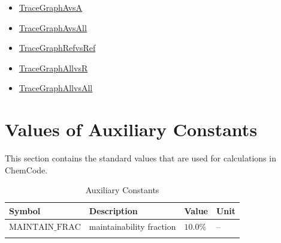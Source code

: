 \documentclass[12pt]{article}
\begin{document}
\begin{itemize}
\item{\hyperref{../../../../traceygraphs/chemcode/avsa.svg}{}{}{TraceGraphAvsA}}
\item{\hyperref{../../../../traceygraphs/chemcode/avsall.svg}{}{}{TraceGraphAvsAll}}
\item{\hyperref{../../../../traceygraphs/chemcode/refvsref.svg}{}{}{TraceGraphRefvsRef}}
\item{\hyperref{../../../../traceygraphs/chemcode/allvsr.svg}{}{}{TraceGraphAllvsR}}
\item{\hyperref{../../../../traceygraphs/chemcode/allvsall.svg}{}{}{TraceGraphAllvsAll}}
\end{itemize}
\section{Values of Auxiliary Constants}
\label{Sec:AuxConstants}
This section contains the standard values that are used for calculations in ChemCode.

\begin{longtable}{l l l l}
\toprule
\textbf{Symbol} & \textbf{Description} & \textbf{Value} & \textbf{Unit}
\\
\midrule
\endhead
$\text{MAINTAIN_FRAC}$ & maintainability fraction & $10.0\%$ & --
\\
\bottomrule
\caption{Auxiliary Constants}
\label{Table:TAuxConsts}
\end{longtable}
\end{document}
